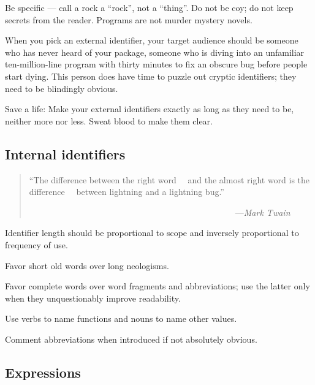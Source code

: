 Be specific --- call a rock a ``rock'', not a ``thing''. 
Do not be coy; do not keep secrets from the reader.  Programs 
are not murder mystery novels.

When you pick an external identifier, your target audience 
should be someone who has never heard of your package, someone 
who is diving into an unfamiliar ten-million-line program with 
thirty minutes to fix an obscure bug before people start dying. 
This person does have time to puzzle out cryptic identifiers; 
they need to be blindingly obvious. 

Save a life: Make your external identifiers exactly as long 
as they need to be, neither more nor less. Sweat blood to make 
them clear. 

\subsection{Internal identifiers}

\begin{quote}\begin{tiny}
               ``The difference between the right word\newline
               ~~and the almost right word is the difference\newline
               ~~between lightning and a lightning bug.''\newline

               ~~~~~~~~~~~~~~~~~~~~~~~~~~~~~~~~~~~~~~~~~~~~~~~~---{\em Mark Twain}
\end{tiny}\end{quote}

Identifier length should be proportional to scope 
and inversely proportional to frequency of use.

Favor short old words over long neologisms.

Favor complete words over word fragments 
and abbreviations;  use the latter only 
when they unquestionably improve readability.

Use verbs to name functions 
and nouns to name other values. 

Comment abbreviations 
when introduced if not absolutely obvious.



\subsection{Expressions}

